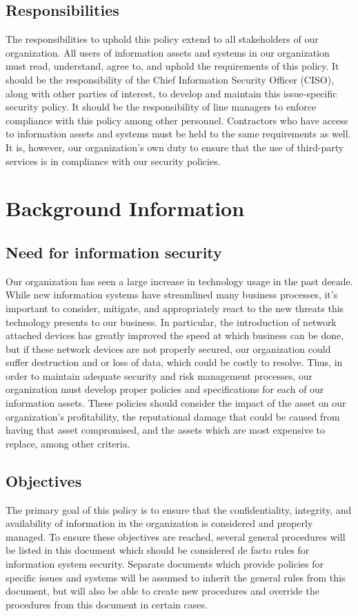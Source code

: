 \documentclass[11pt]{article}
\begin{document}
\subsection{Responsibilities}
\label{sec:orgc3778af}
The responsibilities to uphold this policy extend to all stakeholders of our organization. All users of information assets and systems in our organization must read, understand, agree to, and uphold the requirements of this policy. It should be the responsibility of the Chief Information Security Officer (CISO), along with other parties of interest, to develop and maintain this issue-specific security policy. It should be the responsibility of line managers to enforce compliance with this policy among other personnel. Contractors who have access to information assets and systems must be held to the same requirements as well. It is, however, our organization's own duty to ensure that the use of third-party services is in compliance with our security policies.

\section{Background Information}
\label{sec:orgd8b7ae2}
\subsection{Need for information security}
\label{sec:orgff1baf5}
Our organization has seen a large increase in technology usage in the past decade. While new information systems have streamlined many business processes, it's important to consider, mitigate, and appropriately react to the new threats this technology presents to our business. In particular, the introduction of network attached devices has greatly improved the speed at which business can be done, but if these network devices are not properly secured, our organization could suffer destruction and or loss of data, which could be costly to resolve. Thus, in order to maintain adequate security and risk management processes, our organization must develop proper policies and specifications for each of our information assets. These policies should consider the impact of the asset on our organization's profitability, the reputational damage that could be caused from having that asset compromised, and the assets which are most expensive to replace, among other criteria.

\subsection{Objectives}
\label{sec:org5064673}
The primary goal of this policy is to ensure that the confidentiality, integrity, and availability of information in the organization is considered and properly managed. To ensure these objectives are reached, several general procedures will be listed in this document which should be considered de facto rules for information system security. Separate documents which provide policies for specific issues and systems will be assumed to inherit the general rules from this document, but will also be able to create new procedures and override the procedures from this document in certain cases.
\end{document}
